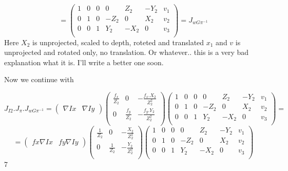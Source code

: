 \documentclass[a4paper,12pt]{article}
\begin{document}
\[
= \begin{pmatrix}
1 & 0 & 0 & 0 & Z_2 & -Y_2 & v_1 \\
0 & 1 & 0 & -Z_2 & 0 & X_2 & v_2 \\
0 & 0 & 1 & Y_2 & -X_2 & 0 & v_3 \\
\end{pmatrix} = J_{wG\pi^{-1}}
\]
Here $X_2$ is unprojected, scaled to depth, roteted and translated $x_1$ and $v$ is unprojected and rotated only, no translation. Or whatever.. this is a very bad explanation what it is. I'll write a better one soon.
\par Now we continue with

\[
J_{I2}.J_{\pi}.J_{wG\pi^{-1}} =
\begin{pmatrix}
\nabla Ix &
\nabla Iy
\end{pmatrix} 
\begin{pmatrix}
\frac{f_x}{Z_2} & 0 & -\frac{f_x.X_2}{Z^2_{2}} \\
0 & \frac{f_y}{Z_2} & -\frac{f_y.Y_2}{Z^2_{2}} \\
\end{pmatrix} 
\begin{pmatrix}
1 & 0 & 0 & 0 & Z_2 & -Y_2 & v_1 \\
0 & 1 & 0 & -Z_2 & 0 & X_2 & v_2 \\
0 & 0 & 1 & Y_2 & -X_2 & 0 & v_3 \\
\end{pmatrix} =
\]
\[
= \begin{pmatrix}
fx \nabla Ix &
fy \nabla Iy
\end{pmatrix} 
\begin{pmatrix}
\frac{1}{Z_2} & 0 & -\frac{X_2}{Z^2_{2}} \\
0 & \frac{1}{Z_2} & -\frac{Y_2}{Z^2_{2}} \\
\end{pmatrix} 
\begin{pmatrix}
1 & 0 & 0 & 0 & Z_2 & -Y_2 & v_1 \\
0 & 1 & 0 & -Z_2 & 0 & X_2 & v_2 \\
0 & 0 & 1 & Y_2 & -X_2 & 0 & v_3 \\
\end{pmatrix} 
\]7
\end{document}
